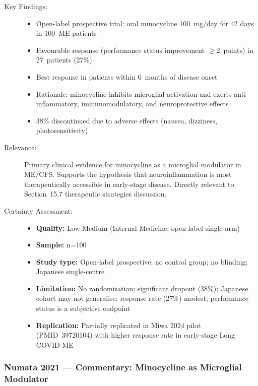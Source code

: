 \begin{description}
    \item[Key Findings:]
    \begin{itemize}
        \item Open-label prospective trial: oral minocycline 100~mg/day for 42 days in 100~ME patients
        \item Favourable response (performance status improvement $\geq$2~points) in 27~patients (27\%)
        \item Best response in patients within 6~months of disease onset
        \item Rationale: minocycline inhibits microglial activation and exerts anti-inflammatory, immunomodulatory, and neuroprotective effects
        \item 38\% discontinued due to adverse effects (nausea, dizziness, photosensitivity)
    \end{itemize}
    \item[Relevance:] Primary clinical evidence for minocycline as a microglial modulator in ME/CFS. Supports the hypothesis that neuroinflammation is most therapeutically accessible in early-stage disease. Directly relevant to Section~15.7 therapeutic strategies discussion.
    \item[Certainty Assessment:]
    \begin{itemize}
        \item \textbf{Quality:} Low-Medium (Internal Medicine; open-label single-arm)
        \item \textbf{Sample:} n=100
        \item \textbf{Study type:} Open-label prospective; no control group; no blinding; Japanese single-centre
        \item \textbf{Limitation:} No randomisation; significant dropout (38\%); Japanese cohort may not generalise; response rate (27\%) modest; performance status is a subjective endpoint
        \item \textbf{Replication:} Partially replicated in Miwa 2024 pilot (PMID~39720104) with higher response rate in early-stage Long COVID-ME
    \end{itemize}
\end{description}

\subsubsection*{Numata 2021 --- Commentary: Minocycline as Microglial Modulator}

